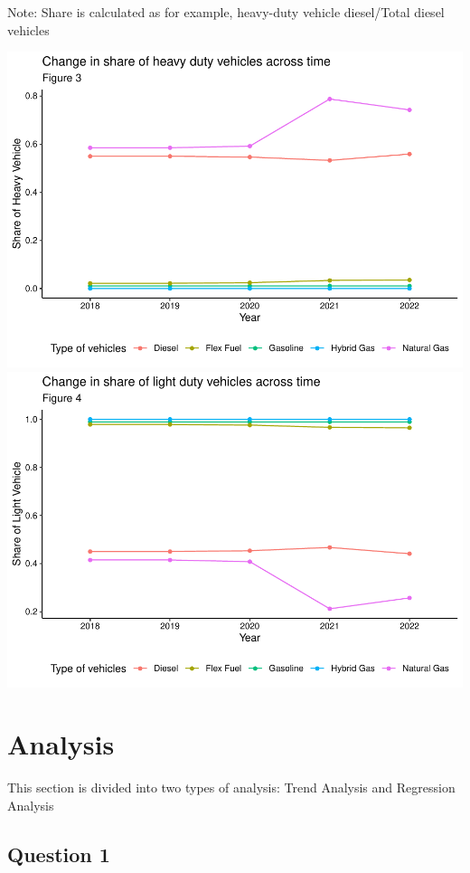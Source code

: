 \documentclass[
  12pt,
]{article}
\begin{document}
Note: Share is calculated as for example, heavy-duty vehicle
diesel/Total diesel vehicles

\includegraphics{Code_Main-Markdown_files/figure-latex/unnamed-chunk-4-1.pdf}
\includegraphics{Code_Main-Markdown_files/figure-latex/unnamed-chunk-4-2.pdf}

\newpage

\hypertarget{analysis}{%
\section{Analysis}\label{analysis}}

This section is divided into two types of analysis: Trend Analysis and
Regression Analysis

\hypertarget{question-1-1}{%
\subsection{Question 1}\label{question-1-1}}
\end{document}
